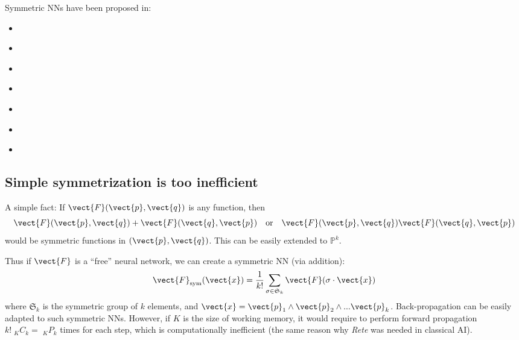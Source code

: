 Symmetric NNs have been proposed in:
\begin{itemize}
	\item {} \parencite{Gens2014}
	\item {} \parencite{Bie2019}
	\item {} \parencite{Ravanbakhsh2016}
	\item {} \parencite{Ravanbakhsh2017}
	\item {} \parencite{Qi2016}
	\item {} \parencite{Qi2017} 
	\item {} \parencite{Zaheer2017}

\end{itemize}

\subsection{Simple symmetrization is too inefficient}

A simple fact:  If $\vect{F}(\vect{p},\vect{q})$ is any function, then
\begin{equation}
\vect{F}(\vect{p},\vect{q}) + \vect{F}(\vect{q},\vect{p}) \quad \mbox{or} \quad \vect{F}(\vect{p},\vect{q})  \vect{F}(\vect{q},\vect{p})
\end{equation}
would be symmetric functions in $(\vect{p},\vect{q})$.  This can be easily extended to $\mathbb{P}^k$.  %

Thus if $\vect{F}$ is a ``free'' neural network, we can create a symmetric NN (via addition):
\begin{equation}
\vect{F}_{\mathrm{sym}}(\vect{x}) = \frac{1}{k!} \sum_{\sigma \in \mathfrak{S}_k} \vect{F}(\sigma \cdot \vect{x})
\end{equation}
where $\mathfrak{S}_k$ is the symmetric group of $k$ elements, and $\vect{x} = \vect{p}_1 \wedge \vect{p}_2 \wedge ... \vect{p}_k$.  Back-propagation can be easily adapted to such symmetric NNs.  However, if $K$ is the size of working memory, it would require to perform forward propagation $k! \;_K C_k = \;_K P_k$ times for each step, which is computationally inefficient (the same reason why \textit{Rete} was needed in classical AI).

